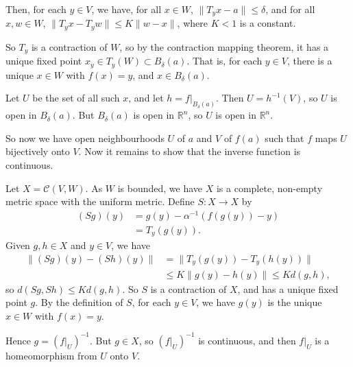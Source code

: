 \documentclass[12pt]{article}
\begin{document}
\begin{proofbox}
	Then, for each $y \in V$, we have, for all $x \in W$, $\|T_yx - a\| \leq \delta$, and for all $x, w \in W$, $\|T_yx - T_yw\| \leq K\|w - x\|$, where $K < 1$ is a constant.

	So $T_y$ is a contraction of $W$, so by the contraction mapping theorem, it has a unique fixed point $x_y \in T_y(W) \subset B_{\delta}(a)$. That is, for each $y \in V$, there is a unique $x \in W$ with $f(x) = y$, and $x \in B_{\delta}(a)$.

	Let $U$ be the set of all such $x$, and let $h = f|_{B_{\delta}(a)}$. Then $U = h^{-1}(V)$, so $U$ is open in $B_{\delta}(a)$. But $B_{\delta}(a)$ is open in $\mathbb{R}^{n}$, so $U$ is open in $\mathbb{R}^{n}$.

	So now we have open neighbourhoods $U$ of $a$ and $V$ of $f(a)$ such that $f$ maps $U$ bijectively onto $V$. Now it remains to show that the inverse function is continuous.

	Let $X = \mathcal{C}(V, W)$. As $W$ is bounded, we have $X$ is a complete, non-empty metric space with the uniform metric. Define $S : X \to X$ by
	\begin{align*}
		(Sg)(y) &= g(y) - \alpha^{-1}(f(g(y)) - y) \\
			&= T_y(g(y)).
	\end{align*}
	Given $g, h \in X$ and $y \in V$, we have
	\begin{align*}
		\|(Sg)(y) - (Sh)(y)\| &= \|T_y(g(y)) - T_y(h(y))\| \\
				      &\leq K\|g(y) - h(y)\| \leq Kd(g, h),
	\end{align*}
	so $d(Sg, Sh) \leq K d(g, h)$. So $S$ is a contraction of $X$, and has a unique fixed point $g$. By the definition of $S$, for each $y \in V$, we have $g(y)$ is the unique $x \in W$ with $f(x) = y$.

	Hence $g = (f|_U)^{-1}$. But $g \in X$, so $(f|_U)^{-1}$ is continuous, and then $f|_U$ is a homeomorphism from $U$ onto $V$.
\end{proofbox}


\newpage

\printindex
\end{document}

